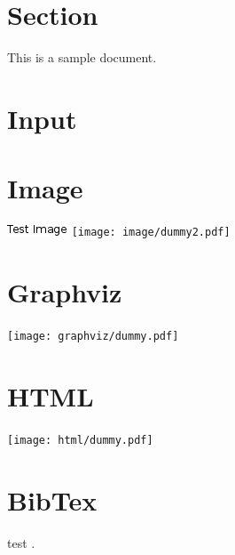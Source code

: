 \documentclass{article}
\begin{document}
\section{Section}
This is a sample document.

\section{Input}



\section{Image}
\includegraphics{image/dummy1.png}
\texttt{[image: image/dummy2.pdf]}

\section{Graphviz}
\texttt{[image: graphviz/dummy.pdf]}

\section{HTML}
\texttt{[image: html/dummy.pdf]}

\section{BibTex}
test \cite{lamport1985i1}.



\end{document}
